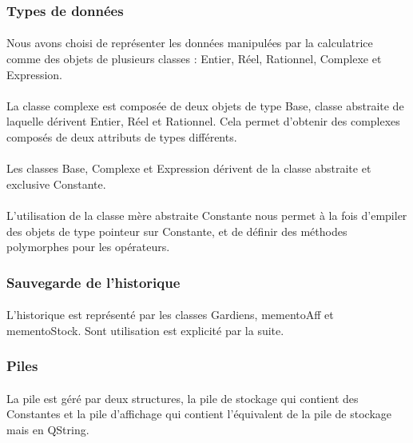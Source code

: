 \documentclass[a4paper,12pt]{article}
\begin{document}
		\subsubsection{Types de données}
			\paragraph{}Nous avons choisi de représenter les données manipulées par la calculatrice comme des objets de plusieurs classes : Entier, Réel, Rationnel, Complexe et Expression. 

			\paragraph{}La classe complexe est composée de deux objets de type Base, classe abstraite de laquelle dérivent Entier, Réel et Rationnel. Cela permet d'obtenir des complexes composés de deux attributs de types différents.

			\paragraph{}Les classes Base, Complexe et Expression dérivent de la classe abstraite et exclusive Constante. 

			\paragraph{}L'utilisation de la classe mère abstraite Constante nous permet à la fois d'empiler des objets de type pointeur sur Constante, et de définir des méthodes polymorphes pour les opérateurs. 

		\subsubsection{Sauvegarde de l'historique}
	 		\paragraph{}L'historique est représenté par les classes Gardiens, mementoAff et mementoStock. Sont utilisation est explicité par la suite.
		\subsubsection{Piles}
			\paragraph{} La pile est géré par deux structures, la pile de stockage qui contient des Constantes et la pile d'affichage qui contient l'équivalent de la pile de stockage mais en QString.
		
\end{document}
